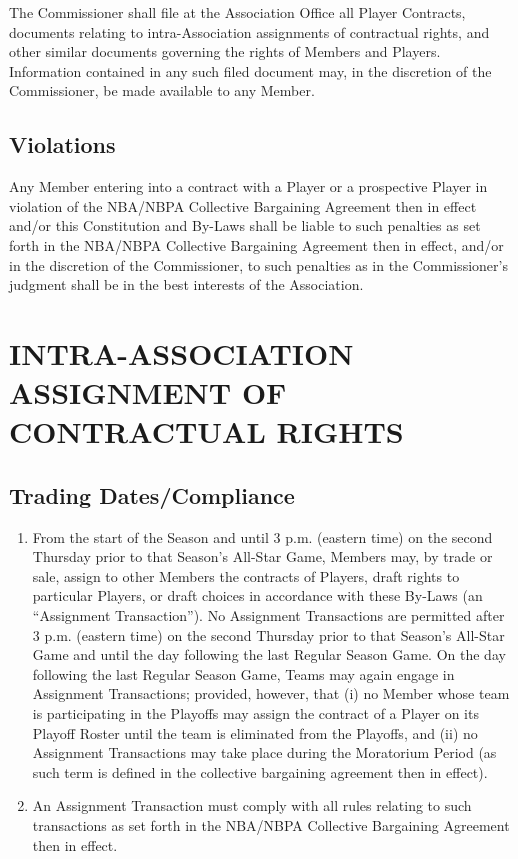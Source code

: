 \documentclass[]{book}
\providecommand{\tightlist}{%
  \setlength{\itemsep}{0pt}\setlength{\parskip}{0pt}}
\begin{document}
The Commissioner shall file at the Association Office all Player Contracts, documents relating to intra-Association assignments of contractual rights, and other similar documents governing the rights of Members and Players. Information contained in any such filed document may, in the discretion of the Commissioner, be made available to any Member.

\hypertarget{violations}{%
\subsection{Violations}\label{violations}}

Any Member entering into a contract with a Player or a prospective Player in violation of the NBA/NBPA Collective Bargaining Agreement then in effect and/or this Constitution and By-Laws shall be liable to such penalties as set forth in the NBA/NBPA Collective Bargaining Agreement then in effect, and/or in the discretion of the Commissioner, to such penalties as in the Commissioner's judgment shall be in the best interests of the Association.

\hypertarget{intra-association-assignment-of-contractual-rights}{%
\section{INTRA-ASSOCIATION ASSIGNMENT OF CONTRACTUAL RIGHTS}\label{intra-association-assignment-of-contractual-rights}}

\hypertarget{trading-datescompliance}{%
\subsection{Trading Dates/Compliance}\label{trading-datescompliance}}

\begin{enumerate}
\def\labelenumi{(\alph{enumi})}
\tightlist
\item
  From the start of the Season and until 3 p.m. (eastern time) on the second Thursday prior to that Season's All-Star Game, Members may, by trade or sale, assign to other Members the contracts of Players, draft rights to particular Players, or draft choices in accordance with these By-Laws (an ``Assignment Transaction''). No Assignment Transactions are permitted after 3 p.m. (eastern time) on the second Thursday prior to that Season's All-Star Game and until the day following the last Regular Season Game. On the day following the last Regular Season Game, Teams may again engage in Assignment Transactions; provided, however, that (i) no Member whose team is participating in the Playoffs may assign the contract of a Player on its Playoff Roster until the team is eliminated from the Playoffs, and (ii) no Assignment Transactions may take place during the Moratorium Period (as such term is defined in the collective bargaining agreement then in effect).
\item
  An Assignment Transaction must comply with all rules relating to such transactions as set forth in the NBA/NBPA Collective Bargaining Agreement then in effect.
\end{enumerate}
\end{document}
